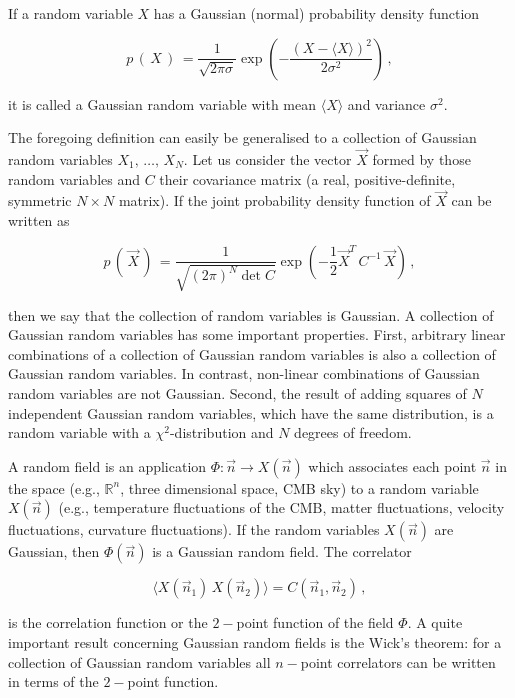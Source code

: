 If a random variable $ X $ has a Gaussian (normal) probability density function 

\begin{equation}
p\,(\,X\,)\, = \frac{1}{\sqrt{2 \pi \sigma}} \exp\left(-\frac{(X-\langle X \rangle)^2}{2\sigma^2}\right)\,,
\end{equation} 

it is called a Gaussian random variable with mean $ \langle X \rangle $ and variance $ \sigma^2 $. 

The foregoing definition can easily be generalised to a collection of Gaussian random variables $X_1,\,\dots,\, X_N$. Let us consider the vector $\vec{X}$ formed by those random variables and $C$ their covariance matrix (a real, positive-definite, symmetric $N \times N$ matrix). If the joint probability density function of $\vec{X}$ can be written as 

\begin{equation}
p\,(\,\vec{X}\,)\, = \frac{1}{\sqrt{(2 \pi)^N \det C }} \exp\left(-\frac{1}{2} \vec{X}^T \,C^{-1}\, \vec{X} \right)\,,
\end{equation}

then we say that the collection of random variables is Gaussian. A collection of Gaussian random variables has some important properties. First, arbitrary linear combinations of a collection of Gaussian random variables is also a collection of Gaussian random variables. In contrast, non-linear combinations of Gaussian random variables are not Gaussian. Second, the result of adding squares of $N$ independent Gaussian random variables, which have the same distribution, is a random variable with a $\chi^2$-distribution and $N$ degrees of freedom.

A random field is an application $\Phi: \vec{n} \rightarrow X(\vec{n})$ which associates each point $\vec{n}$ in the space 
(e.g., $\mathbb{R}^n$, three dimensional space, CMB sky) to a random variable $X(\vec{n})$ (e.g., temperature fluctuations of the CMB, matter fluctuations, velocity fluctuations, curvature fluctuations). If the random variables $X(\vec{n})$ are Gaussian, then $\Phi(\vec{n})$ is a Gaussian random field. The correlator 

\begin{equation}
\langle X(\vec{n}_1) \,X(\vec{n}_2) \rangle = C(\vec{n}_1,\vec{n}_2)\,,
\end{equation}

is the correlation function or the $2-$point function of the field $\Phi$. A quite important result concerning Gaussian random fields is the Wick's theorem: for a collection of Gaussian random variables all $ n- $point correlators can be written in terms of the $ 2- $point function. 

